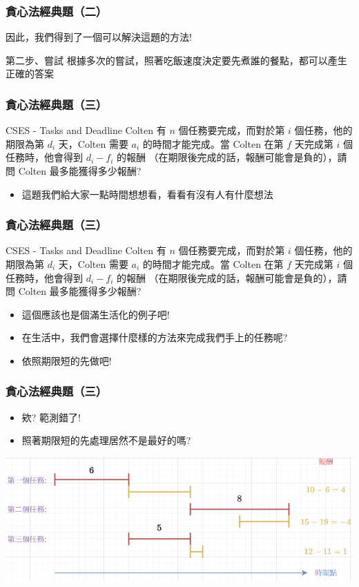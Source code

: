 \documentclass[aspectratio=169]{beamer}
\begin{document}
\begin{frame}
\frametitle{貪心法經典題（二）}
    因此，我們得到了一個可以解決這題的方法!
    \begin{alertblock}{第二步、嘗試}
        根據多次的嘗試，照著吃飯速度決定要先煮誰的餐點，都可以產生正確的答案
    \end{alertblock}
\end{frame}

\begin{frame}
\frametitle{貪心法經典題（三）}
    \begin{block}{CSES - Tasks and Deadline}
        Colten 有 $n$ 個任務要完成，而對於第 $i$ 個任務，他的期限為第 $d_i$ 天，Colten 需要 $a_i$ 的時間才能完成。當 Colten 在第 $f$ 天完成第 $i$ 個任務時，他會得到 $d_i-f_i$ 的報酬 （在期限後完成的話，報酬可能會是負的），請問 Colten 最多能獲得多少報酬?
    \end{block}
    \begin{itemize}
        \item<1-> 這題我們給大家一點時間想想看，看看有沒有人有什麼想法
    \end{itemize}
\end{frame}

\begin{frame}
\frametitle{貪心法經典題（三）}
    \begin{block}{CSES - Tasks and Deadline}
        Colten 有 $n$ 個任務要完成，而對於第 $i$ 個任務，他的期限為第 $d_i$ 天，Colten 需要 $a_i$ 的時間才能完成。當 Colten 在第 $f$ 天完成第 $i$ 個任務時，他會得到 $d_i-f_i$ 的報酬 （在期限後完成的話，報酬可能會是負的），請問 Colten 最多能獲得多少報酬?
    \end{block}
    \begin{itemize}
        \item<1-> 這個應該也是個滿生活化的例子吧!
        \item<2-> 在生活中，我們會選擇什麼樣的方法來完成我們手上的任務呢?
        \item<3-> 依照期限短的先做吧!
    \end{itemize}
\end{frame}

\begin{frame}
\frametitle{貪心法經典題（三）}
    \begin{itemize}
        \item<1-> 欸? 範測錯了!
        \item<2-> 照著期限短的先處理居然不是最好的嗎?
    \end{itemize}
    
    \begin{center}
        \includegraphics[scale=0.7]{images/tasks_and_deadline_1.png}
    \end{center}
\end{frame}
\end{document}
